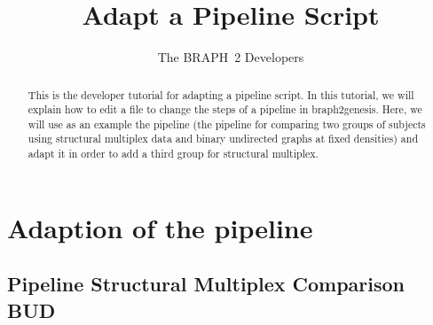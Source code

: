 \documentclass{tufte-handout}
\title{Adapt a Pipeline Script}
\author[The BRAPH~2 Developers]{The BRAPH~2 Developers}
\begin{document}
\maketitle

\begin{abstract}
\noindent
This is the developer tutorial for adapting a pipeline script. 
In this tutorial, we will explain how to edit a  file to change the steps of a pipeline in braph2genesis. Here, we will use as an example the pipeline  (the pipeline for comparing two groups of subjects using structural multiplex data and binary undirected graphs at fixed densities) and adapt it in order to add a third group for structural multiplex.
\end{abstract}

\tableofcontents

\clearpage
\section{Adaption of the pipeline}
\subsection{Pipeline Structural Multiplex Comparison BUD}
\end{document}
